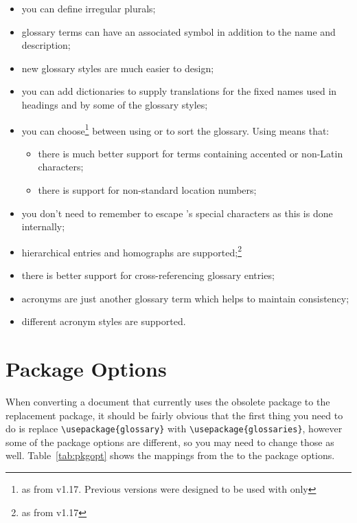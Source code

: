 \documentclass{nlctdoc}
\begin{document}
\begin{itemize}
\item you can define irregular plurals;

\item glossary terms can have an associated symbol in addition
to the name and description;

\item new glossary styles are much easier to design;

\item you can add dictionaries to supply translations for the
fixed names used in headings and by some of the glossary styles;

\item you can choose\footnote{as from v1.17. Previous versions
were designed to be used with  only} between using
 or  to sort the glossary. Using
 means that:

  \begin{itemize}
  \item there is much better support for terms containing accented 
  or non-Latin characters;

  \item there is support for non-standard location numbers;
  \end{itemize}

\item you don't need to remember to escape 's
special characters as this is done internally;

\item hierarchical entries and homographs are supported;\footnote{as
from v1.17}

\item there is better support for cross-referencing glossary entries;

\item acronyms are just another glossary term which helps to
maintain consistency;

\item different acronym styles are supported.

\end{itemize}

\section{Package Options}

When converting a document that currently uses the obsolete
 package to the replacement  package,
it should be fairly obvious that the first thing you need to do is
replace \verb|\usepackage{glossary}| with
\verb|\usepackage{glossaries}|, however some of the package options
are different, so you may need to change those as well.
Table~\ref{tab:pkgopt} shows the mappings from the  
to the  package options.
\end{document}
